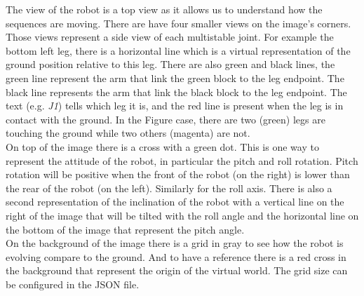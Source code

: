         The view of the robot is a top view as it allows us to understand how the sequences are moving. There are have four smaller views on the image's corners. Those views represent a side view of each multistable joint. For example the bottom left leg, there is a horizontal line which is a virtual representation of the ground position relative to this leg. There are also green and black lines, the green line represent the arm that link the green block to the leg endpoint. The black line represents the arm that link the black block to the leg endpoint. The text (e.g. \textit{J1}) tells which leg it is, and the red line is present when the leg is in contact with the ground. In the Figure case, there are two (green) legs are touching the ground while two others (magenta) are not.\\
        
        On top of the image there is a cross with a green dot. This is one way to represent the attitude of the robot, in particular the pitch and roll rotation. Pitch rotation will be positive when the front of the robot (on the right) is lower than the rear of the robot (on the left). Similarly for the roll axis. There is also a second representation of the inclination of the robot with a vertical line on the right of the image that will be tilted with the roll angle and the horizontal line on the bottom of the image that represent the pitch angle.\\
        
        On the background of the image there is a grid in gray to see how the robot is evolving compare to the ground. And to have a reference there is a red cross in the background that represent the origin of the virtual world. The grid size can be configured in the JSON file. 
        
